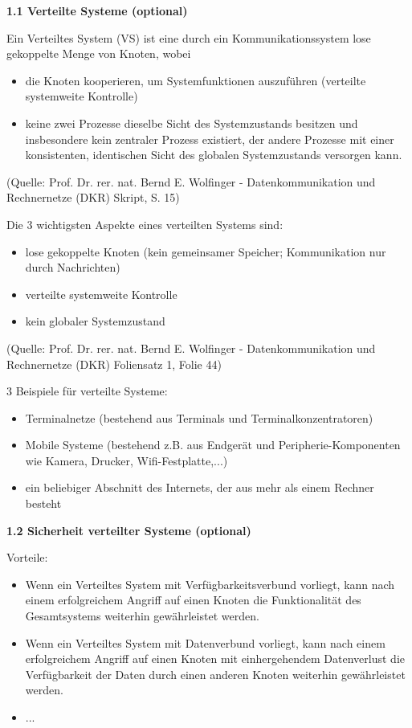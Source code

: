 \documentclass[ngerman]{fbi-aufgabenblatt}
\begin{document}
%
%

\textbf{1.1 Verteilte Systeme (optional)}

\dq Ein Verteiltes System (VS) ist eine durch ein Kommunikationssystem lose gekoppelte Menge von Knoten, wobei

\begin{itemize} 
\item die Knoten kooperieren, um Systemfunktionen auszuführen (verteilte systemweite Kontrolle)
\item keine zwei Prozesse dieselbe Sicht des Systemzustands besitzen und insbesondere kein zentraler Prozess existiert, 
     der andere Prozesse mit einer konsistenten, identischen Sicht des globalen Systemzustands versorgen kann.\dq
\end{itemize}

(Quelle: Prof. Dr. rer. nat. Bernd E. Wolfinger - Datenkommunikation und Rechnernetze (DKR) Skript, S. 15)

\dq Die 3 wichtigsten Aspekte eines verteilten Systems sind:

\begin{itemize} 
\item lose gekoppelte Knoten (kein gemeinsamer Speicher; Kommunikation nur durch Nachrichten)
\item verteilte systemweite Kontrolle
\item kein globaler Systemzustand\dq
\end{itemize}

(Quelle: Prof. Dr. rer. nat. Bernd E. Wolfinger - Datenkommunikation und Rechnernetze (DKR) Foliensatz 1, Folie 44)

3 Beispiele für verteilte Systeme:
\begin{itemize} 
\item Terminalnetze (bestehend aus Terminals und Terminalkonzentratoren)
\item Mobile Systeme (bestehend z.B. aus Endgerät und Peripherie-Komponenten wie Kamera, Drucker, Wifi-Festplatte,...)
\item ein beliebiger Abschnitt des Internets, der aus mehr als einem Rechner besteht
\end{itemize}

\textbf{1.2 Sicherheit verteilter Systeme (optional)}

Vorteile: 
\begin{itemize}
\item Wenn ein Verteiltes System mit Verfügbarkeitsverbund vorliegt, kann nach einem erfolgreichem Angriff auf einen Knoten die Funktionalität des Gesamtsystems weiterhin gewährleistet werden. 
\item Wenn ein Verteiltes System mit Datenverbund vorliegt, kann nach einem erfolgreichem Angriff auf einen Knoten mit einhergehendem Datenverlust die Verfügbarkeit der Daten durch einen  anderen Knoten weiterhin gewährleistet werden.
\item ...
\end{itemize}
\end{document}
